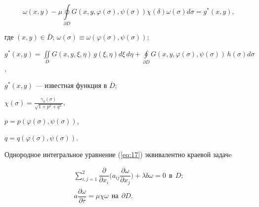 \begin{equation}\label{eq:17}


\omega ({x,y}) - \mu \oint\limits_{\partial D} {G ({x,y,\varphi


(\sigma),\psi (\sigma)})\chi 


(\delta)} \omega (\sigma)d\sigma=g^\ast ({x,y}),


\end{equation}


где $ ({x,y}) \in \overline D $; $\omega (\sigma) 


\equiv \omega ({\varphi (\sigma),\psi (\sigma)})$;


$g^\ast ({x,y})=\iint\limits_D {G ({x,y,\xi ,\eta })\,}


g ({\xi ,\eta })d\xi\, d\eta +


\oint\limits_{\partial D} {G ({x,y,\varphi (\sigma),\psi 


(\sigma)})\,} h (\sigma)d\sigma$,


$g^\ast ({x,y})$ --- известная функция в $\overline D$;


$\chi (\sigma)=\frac{\gamma _0 (\sigma)}{\sqrt {1+p^2+q^2} }$,


$p=p ({\varphi (\sigma),\psi (\sigma)})$,


$q=q ({\varphi (\sigma),\psi (\sigma)})$.





Однородное интегральное уравнение (\ref{eq:17}) эквивалентно краевой задачe


\begin{equation}


\label{eq:18}


\begin{array}{c}


\displaystyle\sum\limits_{i,j=1}^2 \dfrac{\partial }{\partial x_i }


\bigg(a_{ij} \dfrac{\partial \omega }{\partial x_j } \bigg)


+ \lambda b\omega=0 \ \ \text{в} \ \ D; \\[3mm]


a\dfrac{\partial \omega }{\partial \overline \tau } =


\mu \chi \omega \ \ \text{на} \ \ \partial D.


\end{array}


\end{equation}





